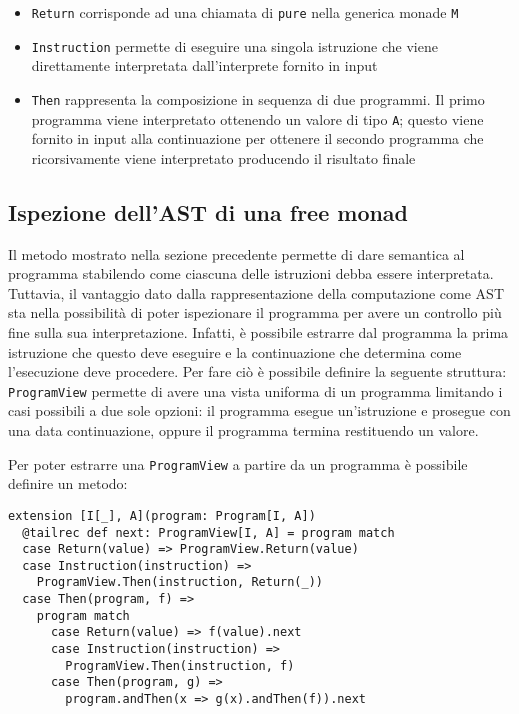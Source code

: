 \begin{itemize}
  \item \lstinline{Return} corrisponde ad una chiamata di \lstinline{pure} nella generica monade \lstinline{M}
  \item \lstinline{Instruction} permette di eseguire una singola istruzione che viene direttamente interpretata dall'interprete fornito in input
  \item \lstinline{Then} rappresenta la composizione in sequenza di due programmi. Il primo programma viene interpretato ottenendo un valore di tipo \lstinline{A}; questo viene fornito in input alla continuazione per ottenere il secondo programma che ricorsivamente viene interpretato producendo il risultato finale
\end{itemize}

\subsection{Ispezione dell'AST di una free monad}
Il metodo mostrato nella sezione precedente permette di dare semantica al programma stabilendo come ciascuna delle istruzioni debba essere interpretata.
Tuttavia, il vantaggio dato dalla rappresentazione della computazione come AST sta nella possibilità di poter ispezionare il programma per avere un controllo più fine sulla sua interpretazione.
Infatti, è possibile estrarre dal programma la prima istruzione che questo deve eseguire e la continuazione che determina come l'esecuzione deve procedere. Per fare ciò è possibile definire la seguente struttura:
\lstinline{ProgramView} permette di avere una vista uniforma di un programma limitando i casi possibili a due sole opzioni: il programma esegue un'istruzione e prosegue con una data continuazione, oppure il programma termina restituendo un valore.

Per poter estrarre una \lstinline{ProgramView} a partire da un programma è possibile definire un metodo:
\begin{lstlisting}[language=scala3]
extension [I[_], A](program: Program[I, A])
  @tailrec def next: ProgramView[I, A] = program match
  case Return(value) => ProgramView.Return(value)
  case Instruction(instruction) =>
    ProgramView.Then(instruction, Return(_))
  case Then(program, f) =>
    program match
      case Return(value) => f(value).next
      case Instruction(instruction) =>
        ProgramView.Then(instruction, f)
      case Then(program, g) =>
        program.andThen(x => g(x).andThen(f)).next
\end{lstlisting}

